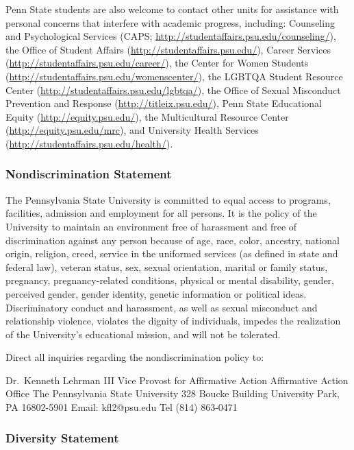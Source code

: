 \documentclass[
  letterpaper,
  DIV=11,
  numbers=noendperiod]{scrartcl}
\begin{document}
Penn State students are also welcome to contact other units for
assistance with personal concerns that interfere with academic progress,
including: Counseling and Psychological Services (CAPS;
\url{http://studentaffairs.psu.edu/counseling/}), the Office of Student
Affairs (\url{http://studentaffairs.psu.edu/}), Career Services
(\url{http://studentaffairs.psu.edu/career/}), the Center for Women
Students (\url{http://studentaffairs.psu.edu/womenscenter/}), the LGBTQA
Student Resource Center (\url{http://studentaffairs.psu.edu/lgbtqa/}),
the Office of Sexual Misconduct Prevention and Response
(\url{http://titleix.psu.edu/}), Penn State Educational Equity
(\url{http://equity.psu.edu/}), the Multicultural Resource Center
(\url{http://equity.psu.edu/mrc}), and University Health Services
(\url{http://studentaffairs.psu.edu/health/}).

\subsubsection*{Nondiscrimination
Statement}\label{non-discrimination-statement}

The Pennsylvania State University is committed to equal access to
programs, facilities, admission and employment for all persons. It is
the policy of the University to maintain an environment free of
harassment and free of discrimination against any person because of age,
race, color, ancestry, national origin, religion, creed, service in the
uniformed services (as defined in state and federal law), veteran
status, sex, sexual orientation, marital or family status, pregnancy,
pregnancy-related conditions, physical or mental disability, gender,
perceived gender, gender identity, genetic information or political
ideas.\\
Discriminatory conduct and harassment, as well as sexual misconduct and
relationship violence, violates the dignity of individuals, impedes the
realization of the University's educational mission, and will not be
tolerated.

Direct all inquiries regarding the nondiscrimination policy to:

Dr.~Kenneth Lehrman III Vice Provost for Affirmative Action Affirmative
Action Office The Pennsylvania State University 328 Boucke Building
University Park, PA 16802-5901 Email: kfl2@psu.edu Tel (814) 863-0471

\subsubsection*{Diversity Statement}\label{diversity-statement}
\end{document}
